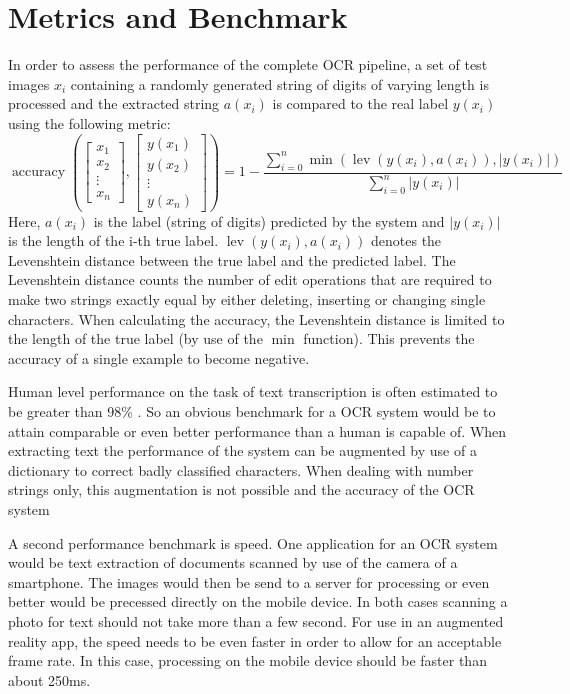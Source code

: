 \documentclass[11pt]{article}
\begin{document}
\section{Metrics and Benchmark}
In order to assess the performance of the complete OCR pipeline, a set of test images $x_i$ containing
a randomly generated string of digits of varying length is processed and the extracted string $a(x_i)$ is
compared to the real label $y(x_i)$ using the following metric:
\begin{equation}
  \operatorname{accuracy}(\begin{bmatrix}x_{1}\\x_{2}\\\vdots\\x_{n}\end{bmatrix},\begin{bmatrix}y(x_{1})\\y(x_{2})\\\vdots\\y(x_{n})\end{bmatrix}) = 1 - \frac{\sum\limits_{i=0}^n{\operatorname{min}\left(\operatorname{lev}(y(x_i), a(x_i)), |y(x_i)|\right)}}{\sum\limits_{i=0}^n{|y(x_i)|}}
\end{equation}
Here, $a(x_i)$ is the label (string of digits) predicted by the system and $|y(x_i)|$ is the length of
the i-th true label. $\operatorname{lev}(y(x_i), a(x_i))$ denotes the Levenshtein distance \cite{Levensht20:online} between
the true label and the predicted label. The Levenshtein distance counts the number of edit operations
that are required to make two strings exactly equal by either deleting, inserting or
changing single characters. When calculating the accuracy, the Levenshtein distance is limited to
the length of the true label (by use of the $\operatorname{min}$ function). This prevents the accuracy
of a single example to become negative.

Human level performance on the task of text transcription is often estimated to be greater
than 98\% \cite{Goodfellow2013}. So an obvious benchmark for a OCR system would be to
attain comparable or even better performance than a human is capable of. When extracting text the
performance of the system can be augmented by use of a dictionary to correct badly classified
characters. When dealing with number strings only, this augmentation is not possible and
the accuracy of the OCR system

A second performance benchmark is speed. One application for an OCR system would be text extraction
of documents scanned by use of the camera of a smartphone. The images would then be send to
a server for processing or even better would be precessed directly on the mobile device.
In both cases scanning a photo for text should not take more than a few second. For use in
an augmented reality app, the speed needs to be even faster in order to allow for an acceptable
frame rate. In this case, processing on the mobile device should be faster than about
250ms.
\end{document}
